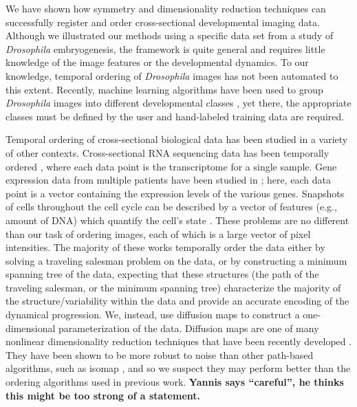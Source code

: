 \documentclass{pnastwo}
\begin{document}
\begin{article}
We have shown how symmetry and dimensionality reduction techniques can successfully register and order cross-sectional developmental imaging data.
%
Although we illustrated our methods using a specific data set from a study of {\it Drosophila} embryogenesis, the framework is quite general and requires little knowledge of the image features or the developmental dynamics.
%
To our knowledge, temporal ordering of {\it Drosophila} images has not been automated to this extent.
%
Recently, machine learning algorithms have been used to group {\it Drosophila} images into different developmental classes \cite{yuan2014automated}, yet there, the appropriate classes must be defined by the user and hand-labeled training data are required.

Temporal ordering of cross-sectional biological data has been studied in a variety of other contexts.
%
Cross-sectional RNA sequencing data has been temporally ordered \cite{anavy2014blind, trapnell2014dynamics}, where each data point is the transcriptome for a single sample.
%
Gene expression data from multiple patients have been studied in \cite{gupta2008extracting, qiu2011discovering};
here, each data point is a vector containing the expression levels of the various genes.
%
Snapshots of cells throughout the cell cycle can be described by a vector of features (e.g., amount of DNA) which quantify the cell's state  \cite{kafri2013dynamics}.
%
These problems are no different than our task of ordering images, each of which is a large vector of pixel intensities.
%
The majority of these works temporally order the data either by solving a traveling salesman problem on the data, or by constructing a minimum spanning tree of the data,
expecting that these structures (the path of the traveling salesman, or the minimum spanning tree) characterize the majority of the structure/variability within the data and provide an accurate encoding of the dynamical progression.
%
We, instead, use diffusion maps to construct a one-dimensional parameterization of the data.
%
Diffusion maps are one of many nonlinear dimensionality reduction techniques that have been recently developed \cite{Belkin2003, tenenbaum2000global, Donoho2003, Roweis2000}.
%
They have been shown to be more robust to noise than other path-based algorithms, such as isomap \cite{balasubramanian2002isomap}, and so we suspect they may perform better than the ordering algorithms used in previous work.
%
{\bf Yannis says ``careful'', he thinks this might be too strong of a statement.}
%
%


\end{article}
\end{document}
